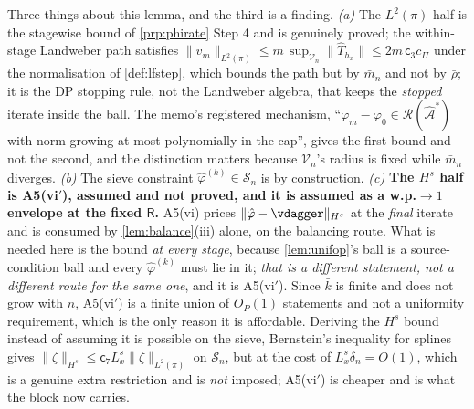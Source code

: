 \begin{lemma}
Three things about this lemma, and the third is a finding.
\emph{(a)} The $L^{2}(\pi)$ half is the stagewise bound of \cref{prp:phirate} Step 4 and is genuinely
proved; the within-stage Landweber path satisfies
$\|v_m\|_{L^{2}(\pi)}\le m\,\sup_{\mathcal V_n}\|\hat T_{h_x}\|\le 2m\,\mathsf c_3c_\Pi$ under the
normalisation of \cref{def:lfstep}, which bounds the path but by $\bar m_n$ and not by $\bar\rho$; it
is the DP stopping rule, not the Landweber algebra, that keeps the \emph{stopped} iterate inside the
ball. The memo's registered mechanism, ``$\varphi_m-\varphi_0\in\mathcal R(\hat{\mathcal A}^\ast)$
with norm growing at most polynomially in the cap'', gives the first bound and not the second, and
the distinction matters because $\mathcal V_n$'s radius is fixed while $\bar m_n$ diverges.
\emph{(b)} The sieve constraint $\hat\varphi^{(k)}\in\mathcal S_n$ is by construction.
\emph{(c)} \textbf{The $H^{s}$ half is A5(vi$'$), assumed and not proved, and it is assumed as a
w.p.$\to1$ envelope at the fixed $\mathsf R$.} A5(vi) prices
$\|\hat\varphi-\vdagger\|_{H^{s}}$ at the \emph{final} iterate and is consumed by
\cref{lem:balance}\textup{(iii)} alone, on the balancing route. What is needed here is the bound
\emph{at every stage}, because \cref{lem:unifop}'s ball is a source-condition ball and every
$\hat\varphi^{(k)}$ must lie in it; \emph{that is a different statement, not a different route for the
same one}, and it is A5(vi$'$). Since $\bar k$ is finite and does not grow with
$n$, A5(vi$'$) is a finite union of $O_P(1)$ statements and not a uniformity requirement, which is
the only reason it is affordable. Deriving the $H^{s}$ bound instead of assuming it is possible on the
sieve, Bernstein's inequality for splines gives
$\|\zeta\|_{H^{s}}\le\mathsf c_7L_x^{s}\|\zeta\|_{L^{2}(\pi)}$ on $\mathcal S_n$, but at the
cost of $L_x^{s}\delta_n=O(1)$, which is a genuine extra restriction and is \emph{not} imposed;
A5(vi$'$) is cheaper and is what the block now carries.
\end{lemma}



